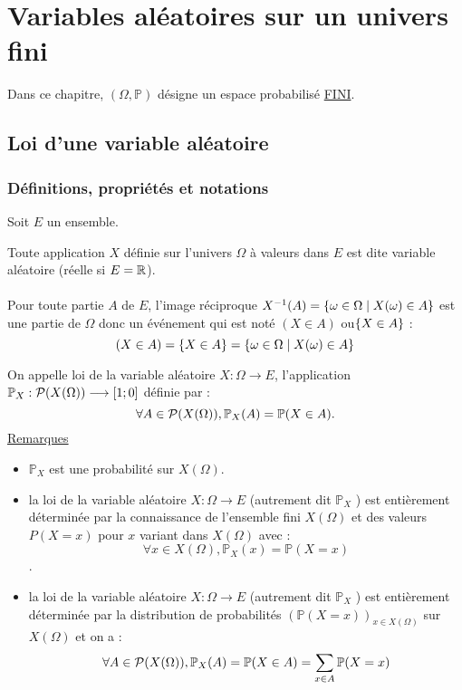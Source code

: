 \chapter{Variables aléatoires sur un univers fini}
\minitoc 
    Dans ce chapitre, \((\Omega, \mathbb{P})\) désigne un espace probabilisé \underline{FINI}.
\section{Loi d’une variable aléatoire}
\subsection{Définitions, propriétés et notations}
    Soit \(E\) un ensemble.
\begin{defprop}
    Toute application \(X\) définie sur l’univers \(\Omega\) à valeurs dans \(E\) est dite variable aléatoire (réelle si \(E = \R\)).\\~\\
    Pour toute partie \(A\) de \(E\), l’image réciproque \(X^{-1} (A) = \accol{\omega \in  \Omega \tq X(\omega) \in  A}\) est une partie de \(\Omega\) donc un événement qui est noté \((X \in  A)\) ou\( \accol{X \in  A}\) :
   \[ (X \in  A) = \accol{X \in  A} = \accol{\omega \in  \Omega \tq X(\omega) \in  A}\] 
\end{defprop}
\begin{defprop}
    On appelle loi de la variable aléatoire \(X : \Omega \to E\), l’application \(\mathbb{P}_{X} : \cal{P} (X(\Omega)) \to \intervii{1}{0}\)  définie par :
    \[\forall A \in  \cal{P} (X (\Omega)) , \mathbb{P}_{X} (A) = \mathbb{P} (X \in  A) .\]
    \underline{Remarques}\\
    \begin{itemize}
        \item \(\mathbb{P}_{X}\) est une probabilité sur \(X(\Omega)\).
        \item la loi de la variable aléatoire \(X : \Omega \to E\) (autrement dit \(\mathbb{P}_{X}\) ) est entièrement déterminée par la connaissance de l’ensemble fini \(X (\Omega)\) et des valeurs \(P (X = x)\) pour \(x\) variant dans \(X (\Omega)\) avec :
            \[\forall x \in  X (\Omega) , \mathbb{P}_{X} ({x}) = \mathbb{P} (X = x)\] .
        \item la loi de la variable aléatoire \(X : \Omega \to E\) (autrement dit \(\mathbb{P}_{X}\) ) est entièrement déterminée par la distribution de probabilités \((\mathbb{P}(X = x))_{x\in X(\Omega)}\) sur \(X(\Omega)\) et on a :
            \[\forall A \in  \cal{P} (X (\Omega)) , \mathbb{P}_{X} (A) = \mathbb{P} (X \in  A) = \sum_{x\in A}\mathbb{P}(X = x)\]
    \end{itemize}
\end{defprop}
